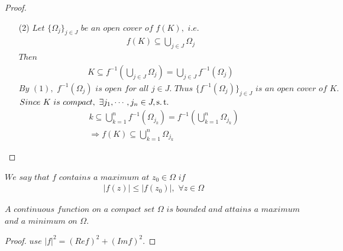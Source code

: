 \begin{proposition}
\begin{proof}
\begin{enumerate}
				\item[(2)]$Let \,\, \{ \Omega_j \}_{j \in J} \,\, be \,\, an \,\, open \,\, cover \,\, of \,\, f(K) , \,\, i.e.$
				\begin{align}
					f(K) \subseteq \bigcup_{j \in J}{\Omega_j}
				\end{align}
				$Then$
				\begin{align}
					K \subseteq f^{-1}(\bigcup_{j \in J}{\Omega_j}) = \bigcup_{j \in J}{f^{-1}(\Omega_j)}
				\end{align}
				$By \,\, (1) , \,\, f^{-1}(\Omega_j) \,\, is \,\, open \,\, for \,\, all \,\, j \in J. \,\, Thus \,\, \{ f^{-1}(\Omega_j) \}_{j \in J} \,\, is \,\, an \,\, open \,\, cover \,\, of \,\, K.$\\
				$Since \,\, K \,\, is \,\, compact , \,\, \exists j_1 , \cdots , j_n \in J , \operatorname{s.t.} $
				\begin{align}
					&k \subseteq \bigcup_{k = 1}^{n}{f^{-1}(\Omega_{j_k})} = f^{-1}(\bigcup_{k = 1}^{n}{\Omega_{j_k}}) \\
					&\Rightarrow f(K) \subseteq \bigcup_{k = 1}^{n}{\Omega_{j_k}}
				\end{align}
			\end{enumerate}
		\end{proof}
	\end{proposition}

	\vspace*{2em}
	$We \,\, say \,\, that \,\, f \,\, contains \,\, a \,\, maximum \,\, at \,\, z_0 \in \Omega \,\, if $
	\begin{align}
		\left| f(z) \right| \leq \left| f(z_0) \right| , \,\, \forall z \in \Omega
	\end{align}

	\begin{proposition}\label{prop 2.1.2}
		$A \,\, continuous \,\, function \,\, on \,\, a \,\, compact \,\, set \,\, \Omega \,\, is \,\, bounded \,\, and \,\, attains \,\, a \,\, maximum $\\ 
		$and \,\, a \,\, minimum \,\, on \,\, \Omega.$
		
		\vspace*{2em}
		\begin{proof}
			$use \,\, \left| f \right|^2 = (Ref)^2 + (Imf)^2$.
		\end{proof}
	\end{proposition}

\newpage
